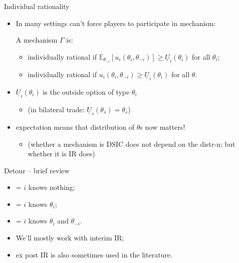 \documentclass[english,10pt
,aspectratio=169
]{beamer}
\begin{document}
\begin{frame}{Individual rationality}
\begin{itemize}
	\item In many settings can't force players to participate in mechanism:
	\begin{definition}[IR]
		A mechanism $\Gamma$ is:
		\begin{itemize}
			\item {} \alert{individually rational} if
			$\mathbb{E}_{\theta_{-i}} \left[u_i(\theta_i,\theta_{-i})\right] \geq \underline{U}_i(\theta_i)$ for all $\theta_i$;
			\item {} \alert{individually rational} if
			$u_i(\theta_i,\theta_{-i}) \geq \underline{U}_i(\theta_i)$ for all $\theta$.
		\end{itemize}
		
		
	\end{definition}
	\item $\underline{U}_i(\theta_i)$ is the outside option of type $\theta_i$
	\begin{itemize}
		\item (in bilateral trade: $\underline{U}_s(\theta_s) = \theta_s$)
	\end{itemize}
	\item expectation means that distribution of $\theta$s now matters!
	\begin{itemize}
		\item (whether a mechanism is DSIC does not depend on the distr-n; but whether it is IR does)
	\end{itemize}
\end{itemize}
\end{frame}


\begin{frame}{Detour -- brief review}
\begin{itemize}
	\item {} = $i$ knows nothing;
	\item {} = $i$ knows $\theta_i$;
	\item {} = $i$ knows $\theta_i$ and $\theta_{-i}$.
	\item We'll mostly work with interim IR; 
	\item ex post IR is also sometimes used in the literature.
\end{itemize}
\end{frame}
\end{document}

